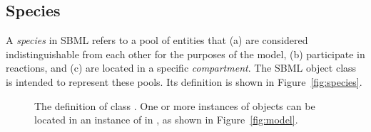 \subsection{Species}
\label{sec:species}

A \emph{species} in SBML refers to a pool of entities that (a) are
considered indistinguishable from each other for the purposes of
the model, (b) participate in reactions, and (c) are located in a
specific \emph{compartment}.  The SBML \Species object class is
intended to represent these pools.  Its definition is shown in
Figure~\vref{fig:species}.

\begin{figure}[htb]
  \centering
  \small
  \vspace*{-1.5ex}
  \caption{The definition of class \Species.  One or more
    instances of \Species objects can be located in an instance of
    \ListOfSpecies in \Model, as shown in
    Figure~\protect\ref{fig:model}.}
  \label{fig:species}
\end{figure}


